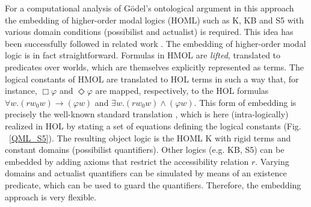 \documentclass{article}
\newcommand{\imp}{\rightarrow}
\begin{document}
For a computational analysis of G\"odel's ontological argument in this
approach the embedding of higher-order modal logics (HOML) such as K,
KB and S5 with various domain conditions (possibilist and actualist)
is required. This idea has been successfully followed in related work
\cite{C40}. The embedding of higher-order modal logic is in fact
straightforward. Formulas in HMOL are \emph{lifted}, translated to predicates
over worlds, which are themselves explicitly represented as
terms. The logical constants of HMOL are translated to HOL terms in such a way that, for instance, 
$\Box \varphi$ and $\Diamond \varphi$ are mapped, respectively, to the
HOL formulas $\forall w. (r w_0 w) \imp (\varphi w)$ and $\exists
w. (r w_0 w) \wedge (\varphi w)$. This form of embedding is precisely
the well-known standard translation
\cite{DBLP:journals/logcom/Ohlbach91}, which is here (intra-logically)
realized in HOL by stating a set of equations defining the logical
constants (Fig. ~\ref{QML_S5}). The resulting object logic is the HOML
K with rigid terms and constant domains (possibilist
quantifiers). Other logics (e.g. KB, S5) can be embedded by adding
axioms that restrict the accessibility relation $r$. Varying domains
and actualist quantifiers can be simulated by means of an existence
predicate, which can be used to guard the quantifiers. Therefore, the
embedding approach is very flexible.
\end{document}

